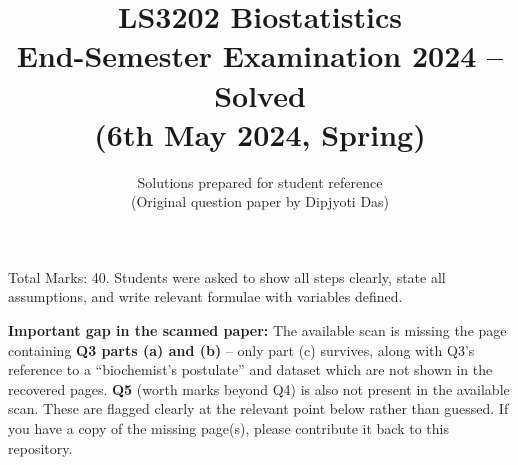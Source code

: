 \documentclass[11pt]{article}
\title{\textbf{LS3202 Biostatistics \\ End-Semester Examination 2024 -- Solved} \\ \large (6th May 2024, Spring)}
\author{Solutions prepared for student reference \\ \small (Original question paper by Dipjyoti Das)}
\date{}
\begin{document}
\maketitle

\begin{tcolorbox}[colback=notecolor!8, colframe=notecolor, title=Note on this paper]
Total Marks: 40. Students were asked to show all steps clearly, state all assumptions, and write relevant formulae with variables defined.

\vspace{0.3em}
\textcolor{gapcolor}{\textbf{Important gap in the scanned paper:}} The available scan is missing the page containing \textbf{Q3 parts (a) and (b)} -- only part (c) survives, along with Q3's reference to a ``biochemist's postulate'' and dataset which are not shown in the recovered pages. \textbf{Q5} (worth marks beyond Q4) is also not present in the available scan. These are flagged clearly at the relevant point below rather than guessed. If you have a copy of the missing page(s), please contribute it back to this repository.
\end{tcolorbox}

\tableofcontents
\vspace{1em}

\end{document}
